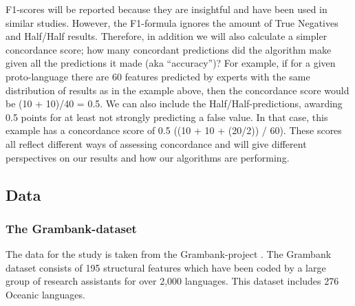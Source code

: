 \documentclass[draft,10pt]{article} %
\begin{document}
F1-scores will be reported because they are insightful and have been used in similar studies. However, the F1-formula ignores the amount of True Negatives and Half/Half results. Therefore, in addition we will also calculate a simpler concordance score; how many concordant predictions did the algorithm make given all the predictions it made (aka ``accuracy'')? For example, if for a given proto-language there are 60 features predicted by experts with the same distribution of results as in the example above, then the concordance score would be (10 + 10)/40 = 0.5. We can also include the Half/Half-predictions, awarding 0.5 points for at least not strongly predicting a false value. In that case, this example has a concordance score of 0.5 ((10 + 10 + (20/2)) / 60). These scores all reflect different ways of assessing concordance and will give different perspectives on our results and how our algorithms are performing. %

\subsection{Data}

\subsubsection{The Grambank-dataset}
\label{asr:sec:GBcoverage}

The data for the study is taken from the Grambank-project \citep{grambankwebsite}. The Grambank dataset consists of 195 structural features which have been coded by a large group of research assistants for over 2,000 languages. This dataset includes 276 Oceanic languages. 

\end{document}

